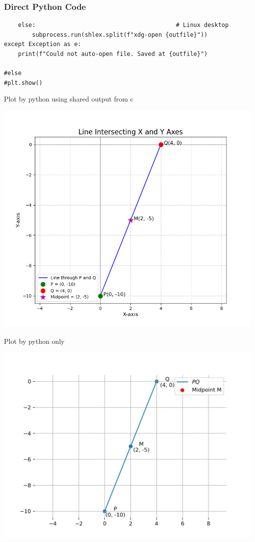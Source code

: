 \documentclass{beamer}
\begin{document}
\begin{frame}[fragile]
	\frametitle{Direct Python Code}
	\begin{lstlisting}
    else:                                        # Linux desktop
        subprocess.run(shlex.split(f"xdg-open {outfile}"))
except Exception as e:
    print(f"Could not auto-open file. Saved at {outfile}")

#else
#plt.show()
\end{lstlisting}
\end{frame}
\begin{frame}{Plot by python using shared output from c}
	\begin{center}
		\includegraphics[width=0.8\columnwidth]{figs/Figure_1.png}
	\end{center}
\end{frame}

\begin{frame}{Plot by python only}
	\begin{center}
		\includegraphics[width=0.9\columnwidth]{figs/fig.png}
	\end{center}
\end{frame}
\end{document}
